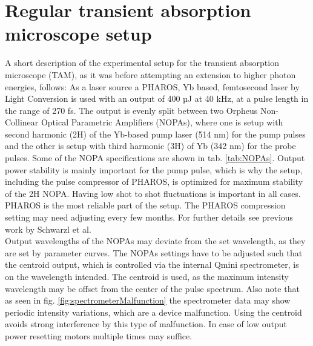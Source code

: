 \documentclass[twoside,openright,listof=numbered]{scrreprt}
\begin{document}
\section{Regular transient absorption microscope setup}\label{RegTAM}
A short description of the experimental setup for the transient absorption microscope (TAM), as it was before attempting an extension to higher photon energies, follows:\newline
As a laser source a PHAROS, Yb based, femtosecond laser by Light Conversion is used with an output of 400 µJ at 40 kHz, at a pulse length in the range of 270 fs. The output is evenly split between two Orpheus Non-Collinear Optical Parametric Amplifiers (NOPAs), where one is setup with second harmonic (2H) of the Yb-based pump laser (514 nm) for the pump pulses and the other is setup with third harmonic (3H) of Yb (342 nm) for the probe pulses. Some of the NOPA specifications are shown in tab. \ref{tab:NOPAs}. Output power stability is mainly important for the pump pulse, which is why the setup, including the pulse compressor of PHAROS, is optimized for maximum stability of the 2H NOPA. Having low shot to shot fluctuations is important in all cases. PHAROS is the most reliable part of the setup. The PHAROS compression setting may need adjusting every few months. For further details see previous work by Schwarzl et al.\cite{Schwarzl2022}\\

Output wavelengths of the NOPAs may deviate from the set wavelength, as they are set by parameter curves. The NOPAs settings have to be adjusted such that the centroid output, which is controlled via the internal Qmini spectrometer, is on the wavelength intended. The centroid is used, as the maximum intensity wavelength may be offset from the center of the pulse spectrum. Also note that as seen in fig. \ref{fig:spectrometerMalfunction} the spectrometer data may show periodic intensity variations, which are a device malfunction. Using the centroid avoids strong interference by this type of malfunction. In case of low output power resetting motors multiple times may suffice.
\end{document}
